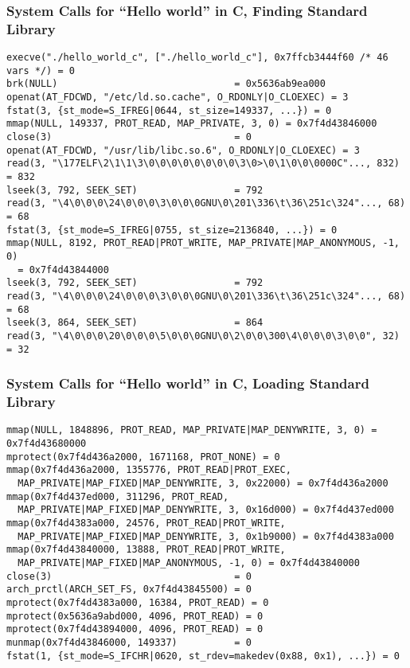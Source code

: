   \begin{frame}[fragile]
    \frametitle{System Calls for ``Hello world'' in C, Finding Standard Library}
    \begin{lstlisting}[basicstyle=\ttfamily\scriptsize]
execve("./hello_world_c", ["./hello_world_c"], 0x7ffcb3444f60 /* 46 vars */) = 0
brk(NULL)                               = 0x5636ab9ea000
openat(AT_FDCWD, "/etc/ld.so.cache", O_RDONLY|O_CLOEXEC) = 3
fstat(3, {st_mode=S_IFREG|0644, st_size=149337, ...}) = 0
mmap(NULL, 149337, PROT_READ, MAP_PRIVATE, 3, 0) = 0x7f4d43846000
close(3)                                = 0
openat(AT_FDCWD, "/usr/lib/libc.so.6", O_RDONLY|O_CLOEXEC) = 3
read(3, "\177ELF\2\1\1\3\0\0\0\0\0\0\0\0\3\0>\0\1\0\0\0000C"..., 832) = 832
lseek(3, 792, SEEK_SET)                 = 792
read(3, "\4\0\0\0\24\0\0\0\3\0\0\0GNU\0\201\336\t\36\251c\324"..., 68) = 68
fstat(3, {st_mode=S_IFREG|0755, st_size=2136840, ...}) = 0
mmap(NULL, 8192, PROT_READ|PROT_WRITE, MAP_PRIVATE|MAP_ANONYMOUS, -1, 0)
  = 0x7f4d43844000
lseek(3, 792, SEEK_SET)                 = 792
read(3, "\4\0\0\0\24\0\0\0\3\0\0\0GNU\0\201\336\t\36\251c\324"..., 68) = 68
lseek(3, 864, SEEK_SET)                 = 864
read(3, "\4\0\0\0\20\0\0\0\5\0\0\0GNU\0\2\0\0\300\4\0\0\0\3\0\0", 32) = 32
    \end{lstlisting}
  \end{frame}

  \begin{frame}[fragile]
    \frametitle{System Calls for ``Hello world'' in C, Loading Standard Library}

    \begin{lstlisting}[basicstyle=\ttfamily\scriptsize]
mmap(NULL, 1848896, PROT_READ, MAP_PRIVATE|MAP_DENYWRITE, 3, 0) = 0x7f4d43680000
mprotect(0x7f4d436a2000, 1671168, PROT_NONE) = 0
mmap(0x7f4d436a2000, 1355776, PROT_READ|PROT_EXEC,
  MAP_PRIVATE|MAP_FIXED|MAP_DENYWRITE, 3, 0x22000) = 0x7f4d436a2000
mmap(0x7f4d437ed000, 311296, PROT_READ,
  MAP_PRIVATE|MAP_FIXED|MAP_DENYWRITE, 3, 0x16d000) = 0x7f4d437ed000
mmap(0x7f4d4383a000, 24576, PROT_READ|PROT_WRITE,
  MAP_PRIVATE|MAP_FIXED|MAP_DENYWRITE, 3, 0x1b9000) = 0x7f4d4383a000
mmap(0x7f4d43840000, 13888, PROT_READ|PROT_WRITE,
  MAP_PRIVATE|MAP_FIXED|MAP_ANONYMOUS, -1, 0) = 0x7f4d43840000
close(3)                                = 0
arch_prctl(ARCH_SET_FS, 0x7f4d43845500) = 0
mprotect(0x7f4d4383a000, 16384, PROT_READ) = 0
mprotect(0x5636a9abd000, 4096, PROT_READ) = 0
mprotect(0x7f4d43894000, 4096, PROT_READ) = 0
munmap(0x7f4d43846000, 149337)          = 0
fstat(1, {st_mode=S_IFCHR|0620, st_rdev=makedev(0x88, 0x1), ...}) = 0
    \end{lstlisting}
  \end{frame}

